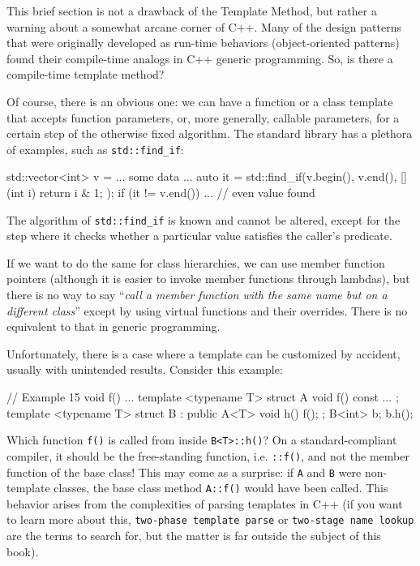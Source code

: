 This brief section is not a drawback of the Template Method, but rather a warning about a somewhat arcane corner of C++. Many of the design patterns that were originally developed as run-time behaviors (object-oriented patterns) found their compile-time analogs in C++ generic programming. So, is there a compile-time template method?

Of course, there is an obvious one: we can have a function or a class template that accepts function parameters, or, more generally, callable parameters, for a certain step of the otherwise fixed algorithm. The standard library has a plethora of examples, such as \texttt{std::find\_if}:

\begin{code}
std::vector<int> v = ... some data ...
auto it = std::find_if(v.begin(), v.end(),
                       [](int i) { return i & 1; });
if (it != v.end()) { ... } // even value found
\end{code}

The algorithm of \texttt{std::find\_if} is known and cannot be altered, except for the step where it checks whether a particular value satisfies the caller's predicate.

If we want to do the same for class hierarchies, we can use member function pointers (although it is easier to invoke member functions through lambdas), but there is no way to say ``\emph{call a member function with the same name but on a different class}'' except by using virtual functions and their overrides. There is no equivalent to that in generic programming.

Unfortunately, there is a case where a template can be customized by accident, usually with unintended results. Consider this example:

\begin{code}
// Example 15
void f() { ... }
template <typename T> struct A {
  void f() const { ... }
};
template <typename T> struct B : public A<T> {
  void h() { f(); }
};
B<int> b;
b.h();
\end{code}

Which function \texttt{f()} is called from inside \texttt{B\textless{}T\textgreater{}::h()}? On a standard-compliant compiler, it should be the free-standing function, i.e. \texttt{::f()}, and not the member function of the base class! This may come as a surprise: if \texttt{A} and \texttt{B} were non-template classes, the base class method \texttt{A::f()} would have been called. This behavior arises from the complexities of parsing templates in C++ (if you want to learn more about this, \texttt{two-phase\ template\ parse} or \texttt{two-stage\ name\ lookup} are the terms to search for, but the matter is far outside the subject of this book).

